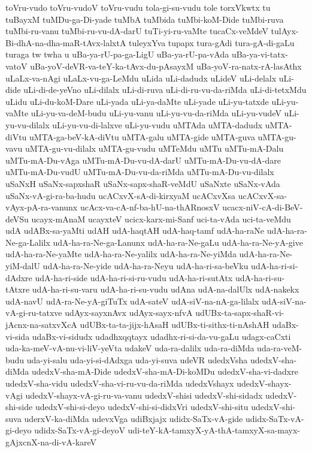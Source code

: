 {toVru-vudo
toVru-vudoV
toVru-vudu
tola-gi-su-vudu
tole
torxVkwtx
tu
tuBayxM
tuMDu-ga-Di-yade
tuMbA
tuMbida
tuMbi-koM-Dide
tuMbi-ruva
tuMbi-ru-vanu
tuMbi-ru-vu-dA-darU
tuTi-yi-ru-vaMte
tucaCx-veMdeV
tulAyx-Bi-dhA-na-dha-maR-tAvx-lalxtA
tuleyxYva
tupapx
tura-gAdi
tura-gA-di-gaLu
turaga
tw
twha
u
uBa-ya-rU-pa-ga-LigU
uBa-ya-rU-pa-vAda
uBa-ya-vi-tatx-vatoV
uBa-yoV-deVR-va-teY-ka-tAvx-du-pAsayxM
uBa-yoV-ra-natx-rA-lasAthx
uLaLx-va-nAgi
uLaLx-vu-ga-LeMdu
uLida
uLi-dadudx
uLideV
uLi-delalx
uLi-dide
uLi-di-de-yeVno
uLi-dilalx
uLi-di-ruva
uLi-di-ru-vu-da-riMda
uLi-di-tetxMdu
uLidu
uLi-du-koM-Dare
uLi-yada
uLi-ya-daMte
uLi-yade
uLi-yu-tatxde
uLi-yu-vaMte
uLi-yu-va-deM-budu
uLi-yu-vanu
uLi-yu-vu-da-riMda
uLi-yu-vudeV
uLi-yu-vu-dilalx
uLi-yu-vu-di-lalxve
uLi-yu-vudu
uMTAda
uMTA-dadudx
uMTA-diVtu
uMTA-ga-beV-kA-diVtu
uMTA-galu
uMTA-gide
uMTA-guva
uMTA-gu-vavu
uMTA-gu-vu-dilalx
uMTA-gu-vudu
uMTeMdu
uMTu
uMTu-mA-Dalu
uMTu-mA-Du-vAga
uMTu-mA-Du-vu-dA-darU
uMTu-mA-Du-vu-dA-dare
uMTu-mA-Du-vudU
uMTu-mA-Du-vu-da-riMda
uMTu-mA-Du-vu-dilalx
uSaNxH
uSaNx-sapxshaR
uSaNx-sapx-shaR-veMdU
uSaNxte
uSaNx-vAda
uSaNx-vA-gi-ra-ba-hudu
ucACxvX-sA-di-kirxyaM
ucACxvXsa
ucACxvX-sa-vAyx-pA-ra-vanunx
ucAcx-va-cA-nf-ba-hU-na-thARnosxV
ucacx-niV-cA-di-BeV-deVSu
ucayx-mAnaM
ucayxteV
ucicx-karx-mi-Sanf
uci-ta-vAda
uci-ta-veMdu
udA
udABx-sa-yaMti
udAH
udA-haqtAH
udA-haq-tamf
udA-ha-raNe
udA-ha-ra-Ne-ga-Lalilx
udA-ha-ra-Ne-ga-Lanunx
udA-ha-ra-Ne-gaLu
udA-ha-ra-Ne-yA-give
udA-ha-ra-Ne-yaMte
udA-ha-ra-Ne-yalilx
udA-ha-ra-Ne-yiMda
udA-ha-ra-Ne-yiM-dalU
udA-ha-ra-Ne-yide
udA-ha-ra-Neyu
udA-ha-ri-sa-beVku
udA-ha-ri-si-dAdxre
udA-ha-ri-side
udA-ha-ri-si-ru-vudu
udA-ha-ri-sutAtx
udA-ha-ri-su-tAtxre
udA-ha-ri-su-varu
udA-ha-ri-su-vudu
udAna
udA-na-dalUlx
udA-nakekx
udA-navU
udA-ra-Ne-yA-giTuTx
udA-sateV
udA-siV-na-nA-ga-lilalx
udA-siV-na-vA-gi-ru-tatxve
udAyx-sayxnAvx
udAyx-sayx-nfvA
udUBx-ta-sapx-shaR-vi-jAcnx-na-satxvXcA
udUBx-ta-ta-jijx-hAsaH
udUBx-ti-sithx-ti-nAshAH
udaBx-vi-sida
udaBx-vi-sidudx
udadhxqqtayx
udadhx-ri-si-da-vu-gaLu
udagx-caCxti
uda-ka-meV-vA-nu-vi-liV-yeVta
udakeV
uda-ra-dalilx
uda-ra-diMda
uda-ra-veM-budu
uda-yi-salu
uda-yi-si-dAdxga
uda-yi-suva
udeVR
udedxVsha
udedxV-sha-diMda
udedxV-sha-mA-Dide
udedxV-sha-mA-Di-koMDu
udedxV-sha-vi-dadxre
udedxV-sha-vidu
udedxV-sha-vi-ru-vu-da-riMda
udedxVshayx
udedxV-shayx-vAgi
udedxV-shayx-vA-gi-ru-va-vanu
udedxV-shisi
udedxV-shi-sidadx
udedxV-shi-side
udedxV-shi-si-deyo
udedxV-shi-si-didxVri
udedxV-shi-situ
udedxV-shi-suva
uderxV-ka-diMda
udevxVga
udiBxjajx
udidx-SaTx-vA-gide
udidx-SaTx-vA-gi-deyo
udidx-SaTx-vA-gi-deyoV
udi-teY-kA-tamxyX-yA-thA-tamxyX-sa-mayx-gAjxcnX-na-di-vA-kareV
}
